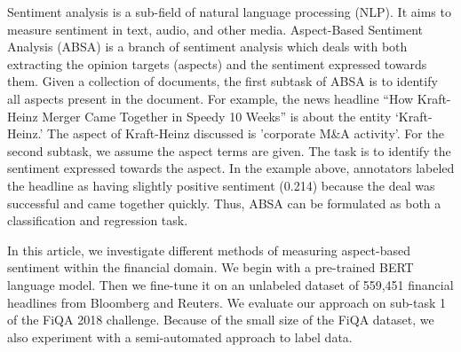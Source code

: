 \documentclass[11pt,a4paper,titlepage]{article}
\begin{document}










Sentiment analysis is a sub-field of natural language processing (NLP). It aims to measure sentiment in text, audio, and other media. Aspect-Based Sentiment Analysis (ABSA) is a branch of sentiment analysis which deals with both extracting the opinion targets (aspects) and the sentiment expressed towards them. Given a collection of documents, the first subtask of ABSA is to identify all aspects present in the document. For example, the news headline “How Kraft-Heinz Merger Came Together in Speedy 10 Weeks” is about the entity ‘Kraft-Heinz.’ The aspect of Kraft-Heinz discussed is 'corporate M\&A activity'. For the second subtask, we assume the aspect terms are given. The task is to identify the sentiment expressed towards the aspect. In the example above, annotators labeled the headline as having slightly positive sentiment (0.214) because the deal was successful and came together quickly. Thus, ABSA can be formulated as both a classification and regression task.










In this article, we investigate different methods of measuring aspect-based sentiment within the financial domain.  We begin with a pre-trained BERT language model. Then we fine-tune it on an unlabeled dataset of 559,451 financial headlines from Bloomberg and Reuters. We evaluate our approach on sub-task 1 of the FiQA 2018 challenge. Because of the small size of the FiQA dataset, we also experiment with a semi-automated approach to label data.
\end{document}
